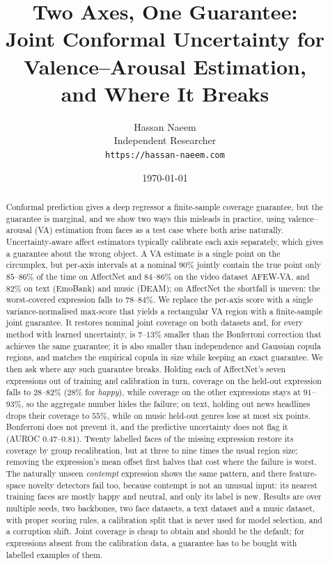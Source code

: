 \documentclass[11pt]{article}
\title{Two Axes, One Guarantee:\\
       Joint Conformal Uncertainty for Valence--Arousal Estimation,\\
       and Where It Breaks}
\author{Hassan Naeem\\
        \normalsize Independent Researcher\\
        \normalsize \texttt{https://hassan-naeem.com}}
\date{\today}
\begin{document}
\maketitle

\begin{abstract}
Conformal prediction gives a deep regressor a finite-sample coverage
guarantee, but the guarantee is marginal, and we show two ways this misleads in
practice, using valence--arousal (VA) estimation from faces as a test case where
both arise naturally. Uncertainty-aware affect estimators typically calibrate
each axis separately, which gives a guarantee about the wrong object. A VA estimate is a single point on the circumplex, but per-axis
intervals at a nominal $90\%$ jointly contain the true point only
$85$--$86\%$ of the time on AffectNet and $84$--$86\%$ on the video dataset
AFEW-VA, and $82\%$ on text (EmoBank) and music (DEAM); on AffectNet the shortfall is uneven: the worst-covered expression falls to
$78$--$84\%$. We replace the per-axis score with a single variance-normalised
max-score that yields a rectangular VA region with a finite-sample joint
guarantee. It restores nominal joint coverage on both datasets and, for every
method with learned uncertainty, is $7$--$13\%$ smaller than the Bonferroni
correction that achieves the same guarantee; it is also smaller than
independence and Gaussian copula regions, and matches the empirical copula in
size while keeping an exact guarantee. We then ask where any such
guarantee breaks. Holding each of AffectNet's seven expressions out of training
and calibration in turn, coverage on the held-out expression falls to
$28$--$82\%$ ($28\%$ for \emph{happy}), while coverage on the other
expressions stays at $91$--$93\%$, so the aggregate number hides the failure;
on text, holding out news headlines drops their coverage to $55\%$, while on
music held-out genres lose at most six points.
Bonferroni does not prevent it, and the predictive uncertainty does not flag
it (AUROC $0.47$--$0.81$). Twenty labelled faces of the missing expression
restore its coverage by group recalibration, but at three to nine times the
usual region size; removing the expression's mean offset first halves that cost
where the failure is worst. The naturally unseen \emph{contempt} expression
shows the same pattern, and there feature-space novelty detectors fail too,
because contempt is not an unusual input: its nearest training faces are mostly
happy and neutral, and only its label is new. Results are over multiple seeds,
two backbones, two face datasets, a text dataset and a music dataset, with proper scoring rules, a calibration split
that is never used for model selection, and a corruption shift. Joint coverage
is cheap to obtain and should be the default; for expressions absent from the
calibration data, a guarantee has to be bought with labelled examples of them.
\end{abstract}











\end{document}
